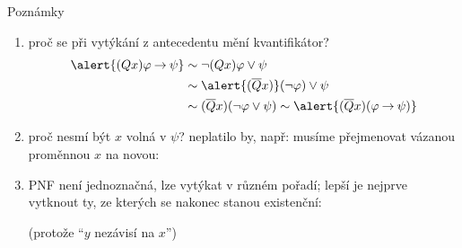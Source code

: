 \documentclass{beamer}
\begin{document}
\begin{frame}{Poznámky}

    \begin{enumerate}
        \item proč se při vytýkání z \alert{antecedentu} mění kvantifikátor?
        \begin{align*}
            \alert{(Qx)\varphi \limplies \psi}&\sim\neg(Qx)\varphi \lor\psi\\&\sim\alert{(\overline{Q}x)}(\neg\varphi)\lor\psi\\
            &\sim(\overline{Q}x)(\neg\varphi\lor\psi)\sim \alert{(\overline{Q}x)(\varphi \limplies \psi)}    
        \end{align*}

        \medskip
    
        \item proč nesmí být $x$ volná v $\psi$? neplatilo by, např:
        musíme přejmenovat vázanou proměnnou $x$ na novou: 
        

        \medskip

        \item PNF není jednoznačná, lze vytýkat v různém pořadí; lepší je nejprve vytknout ty, \alert{ze kterých se nakonec stanou existenční:}
        
        \medskip

        
        \medskip

        (protože ``$y$ nezávisí na $x$'')
    \end{enumerate}

\end{frame}
\end{document}
